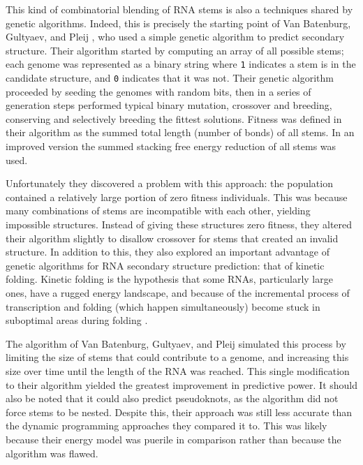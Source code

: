 \documentclass{cshonours}
\begin{document}
This kind of combinatorial blending of RNA stems is also a techniques shared by genetic algorithms. Indeed, this
is precisely the starting point of Van Batenburg, Gultyaev, and Pleij \cite{van1995apl}, who
used a simple genetic algorithm to predict secondary structure. Their algorithm
started by computing an array of all possible stems; each genome was represented
as a binary string where \texttt{1} indicates a stem is in the candidate structure, and \texttt{0}
indicates that it was not. Their genetic algorithm proceeded by seeding the genomes
with random bits, then in a series of generation steps performed typical binary
mutation, crossover and breeding, conserving and selectively breeding the fittest
solutions. Fitness was defined in their algorithm as the summed total length
(number of bonds) of all stems. In an improved version the summed stacking
free energy reduction of all stems was used.

Unfortunately they discovered a problem with this approach: the population
contained a relatively large portion of zero fitness individuals. This was because
many combinations of stems are incompatible with each other, yielding impossible
structures. Instead of giving these structures zero fitness, they altered their algorithm slightly to disallow crossover for stems that created an invalid structure.
In addition to this, they also explored an important advantage of genetic algorithms for RNA secondary structure prediction: that of kinetic folding. Kinetic
folding is the hypothesis that some RNAs, particularly large ones, have a rugged
energy landscape, and because of the incremental process of transcription and
folding (which happen simultaneously) become stuck in suboptimal areas during
folding \cite{treiber2001beyond, van1995apl}. 

The algorithm of Van Batenburg, Gultyaev, and Pleij simulated
this process by limiting the size of stems that could contribute to a genome, and
increasing this size over time until the length of the RNA was reached. This
single modification to their algorithm yielded the greatest improvement in predictive power. It should also be noted that it could also predict pseudoknots, as
the algorithm did not force stems to be nested. Despite this, their approach was
still less accurate than the dynamic programming approaches they compared it
to. This was likely because their energy model was puerile in comparison rather than because the algorithm was flawed.
\end{document}
